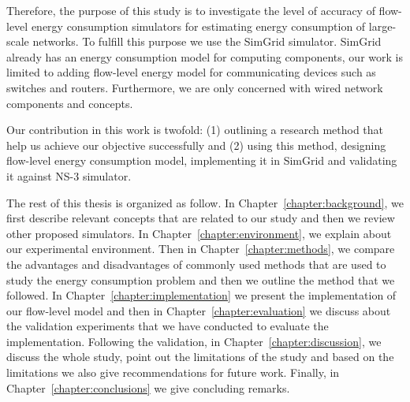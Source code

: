 Therefore, the purpose of this study is to investigate the level of accuracy of flow-level energy consumption simulators for estimating energy consumption of large-scale networks. To fulfill this purpose we use the SimGrid simulator. SimGrid already has an energy consumption model for computing components, our work is limited to adding flow-level energy model for communicating devices such as switches and routers. Furthermore, we are only concerned with wired network components and concepts. 

Our contribution in this work is twofold: (1) outlining a research method that help us achieve our objective successfully and (2) using this method, designing flow-level energy consumption model, implementing it in SimGrid and validating it against NS-3 simulator. 

The rest of this thesis is organized as follow. In Chapter~\ref{chapter:background}, we first describe relevant concepts that are related to our study and then we review other proposed simulators. In Chapter~\ref{chapter:environment}, we explain about our experimental environment. Then in Chapter~\ref{chapter:methods}, we compare the advantages and disadvantages of commonly used methods that are used to study the energy consumption problem and then we outline the method that we followed. In Chapter~\ref{chapter:implementation} we present the implementation of our flow-level model and then in Chapter~\ref{chapter:evaluation} we discuss about the validation experiments that we have conducted to evaluate the implementation. Following the validation, in Chapter~\ref{chapter:discussion}, we discuss the whole study, point out the limitations of the study and based on the limitations we also give recommendations for future work. Finally, in Chapter~\ref{chapter:conclusions} we give concluding remarks.


